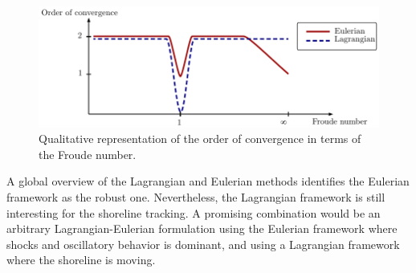 \begin{figure}
    \centering
    \includegraphics[width=\textwidth]{img/lagrangian/lagrangian_eulerian_convergence.pdf}
    \caption{Qualitative representation of the order of convergence in terms of the Froude number.}
    \label{pfem_euler_convergence}
\end{figure}


A global overview of the Lagrangian and Eulerian methods identifies the Eulerian framework as the robust one. Nevertheless, the Lagrangian framework is still interesting for the shoreline tracking.
A promising combination would be an arbitrary Lagrangian-Eulerian formulation using the Eulerian framework where shocks and oscillatory behavior is dominant, and using a Lagrangian framework where the shoreline is moving.

